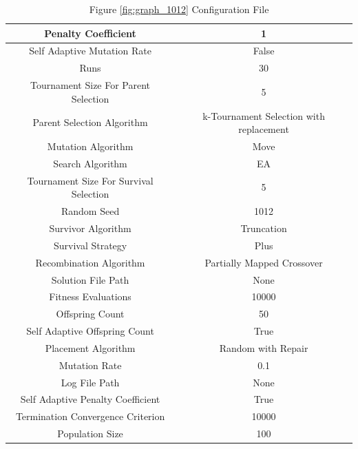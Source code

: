 \documentclass{standalone}
\begin{document}
\begin{table}[!htb]
	\centering
	\caption{Figure \ref{fig:graph_1012} Configuration File}
	\label{tab:graph_1012}
	\begin{tabular}{| c | c |}
		\hline
		Penalty Coefficient		& 1		 \\
		\hline
		Self Adaptive Mutation Rate		& False		 \\
		\hline
		Runs		& 30		 \\
		\hline
		Tournament Size For Parent Selection		& 5		 \\
		\hline
		Parent Selection Algorithm		& k-Tournament Selection with replacement		 \\
		\hline
		Mutation Algorithm		& Move		 \\
		\hline
		Search Algorithm		& EA		 \\
		\hline
		Tournament Size For Survival Selection		& 5		 \\
		\hline
		Random Seed		& 1012		 \\
		\hline
		Survivor Algorithm		& Truncation		 \\
		\hline
		Survival Strategy		& Plus		 \\
		\hline
		Recombination Algorithm		& Partially Mapped Crossover		 \\
		\hline
		Solution File Path		& None		 \\
		\hline
		Fitness Evaluations		& 10000		 \\
		\hline
		Offspring Count		& 50		 \\
		\hline
		Self Adaptive Offspring Count		& True		 \\
		\hline
		Placement Algorithm		& Random with Repair		 \\
		\hline
		Mutation Rate		& 0.1		 \\
		\hline
		Log File Path		& None		 \\
		\hline
		Self Adaptive Penalty Coefficient		& True		 \\
		\hline
		Termination Convergence Criterion		& 10000		 \\
		\hline
		Population Size		& 100		 \\
		\hline
	\end{tabular}
\end{table}
\end{document}
